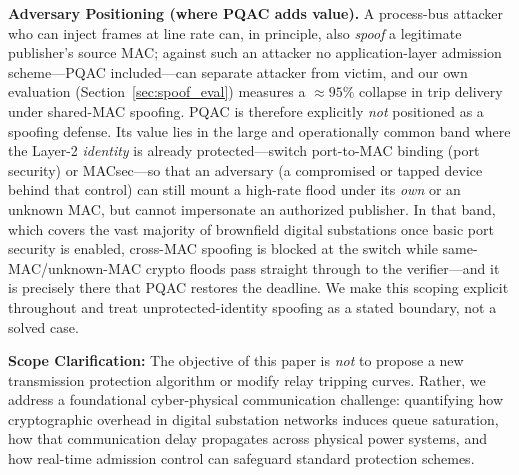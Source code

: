 \documentclass[journal]{IEEEtran}
\begin{document}
\textbf{Adversary Positioning (where PQAC adds value).} A process-bus attacker who can inject frames at line rate can, in principle, also \emph{spoof} a legitimate publisher's source MAC; against such an attacker no application-layer admission scheme---PQAC included---can separate attacker from victim, and our own evaluation (Section~\ref{sec:spoof_eval}) measures a $\approx 95\%$ collapse in trip delivery under shared-MAC spoofing. PQAC is therefore explicitly \emph{not} positioned as a spoofing defense. Its value lies in the large and operationally common band where the Layer-2 \emph{identity} is already protected---switch port-to-MAC binding (port security) or MACsec---so that an adversary (a compromised or tapped device behind that control) can still mount a high-rate flood under its \emph{own} or an unknown MAC, but cannot impersonate an authorized publisher. In that band, which covers the vast majority of brownfield digital substations once basic port security is enabled, cross-MAC spoofing is blocked at the switch while same-MAC/unknown-MAC crypto floods pass straight through to the verifier---and it is precisely there that PQAC restores the deadline. We make this scoping explicit throughout and treat unprotected-identity spoofing as a stated boundary, not a solved case.

\textbf{Scope Clarification:} The objective of this paper is \emph{not} to propose a new transmission protection algorithm or modify relay tripping curves. Rather, we address a foundational cyber-physical communication challenge: quantifying how cryptographic overhead in digital substation networks induces queue saturation, how that communication delay propagates across physical power systems, and how real-time admission control can safeguard standard protection schemes.
\end{document}
